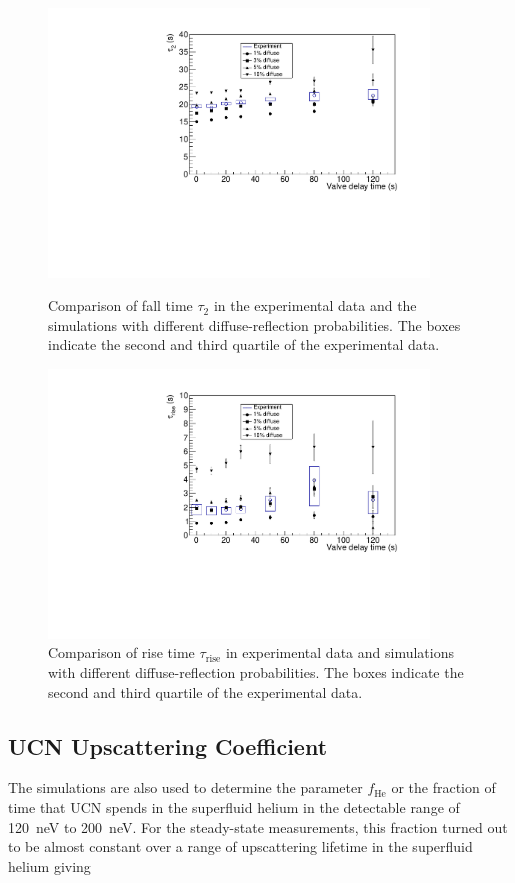 \begin{figure}[h!]
  \centering \includegraphics[width=0.9\textwidth]{falltime.pdf}
  \caption{Comparison of fall time $\tau_2$ in the experimental data
    and the simulations with different diffuse-reflection
    probabilities. The boxes indicate the second and third quartile of
    the experimental data.}
\label{fig:falltime}
\includegraphics[width=0.9\textwidth]{risetime.pdf}
\caption{Comparison of rise time $\tau_{\mathrm{rise}}$ in
  experimental data and simulations with different diffuse-reflection
  probabilities. The boxes indicate the second and third quartile of
  the experimental data.}
\label{fig:risetime}
\end{figure}


\subsection{UCN Upscattering Coefficient}
The simulations are also used to determine the parameter
$f_{\mathrm{He}}$ or the fraction of time that UCN spends in the
superfluid helium in the detectable range of 120~neV to 200~neV.
For the steady-state measurements, this fraction turned out to be
almost constant over a range of upscattering lifetime in the
superfluid helium giving

